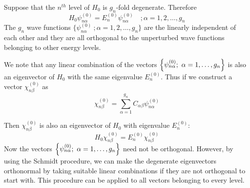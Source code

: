 	Suppose that the $n^{th}$ level of $H_0$ is $g_n$-fold degenerate. Therefore
	\begin{equation}
		H_0 \psi^{(0)}_{n \alpha} = E_n^{(0)} \psi^{(0)}_{n \alpha} \quad ; \alpha = 1,2,\ldots, g_n
		\label{chapter20.eqn2-degenerate} 
	\end{equation}
	The $g_n$ wave functions $\{\psi^{(0)}_{n \alpha}\ ; \alpha=1,2,\ldots, g_n\}$ are the linearly independent of each other and they are all orthogonal to the unperturbed wave functions belonging to other energy levels.
	
	We note that any linear combination of the vectors $\qty{\psi^{(0)}_{n \alpha}; \ \alpha=1,\ldots,g_n}$ is also an eigenvector of $H_0$ with the same eigenvalue $E_n^{(0)}$. Thus if we construct a vector $\chi^{(0)}_{n \beta}$ as
	\begin{equation}
		\chi^{(0)}_{n \beta} = \sum_{\alpha = 1}^{g_n} C_{\alpha \beta} \psi^{(0)}_{n\alpha}
		\label{chapter20.eqn3-degenerate} 
	\end{equation}
	
	Then $\chi^{(0)}_{n \beta}$ is also an eigenvector of $H_0$ with eigenvalue $E_n^{(0)}$:
	\begin{equation}
		H_0 \chi^{(0)}_{n \beta} = E_n^{(0)} \chi^{(0)}_{n \beta}
		\label{chapter20.eqn4-degenerate} 
	\end{equation}
	Now the vectors $\qty{\psi^{(0)}_{n \alpha}; \ \alpha=1,\ldots,g_n}$ need not be orthogonal. However, by using the Schmidt procedure, we can make the degenerate eigenvectors orthonormal by taking suitable linear combinations if they are not orthogonal to start with. This procedure can be applied to all vectors belonging to every level.
	
